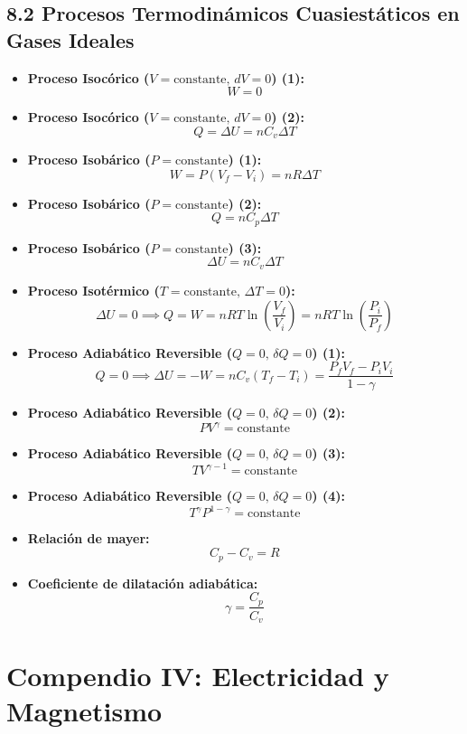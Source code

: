 \documentclass[11pt,a4paper]{article}
\begin{document}
\subsection*{8.2 Procesos Termodinámicos Cuasiestáticos en Gases Ideales}

\begin{itemize}
  \item \textbf{Proceso Isocórico ($V = \text{constante}, \, dV = 0$) (1):}
  \[
    W = 0
  \]
  \item \textbf{Proceso Isocórico ($V = \text{constante}, \, dV = 0$) (2):}
  \[
    Q = \Delta U = n C_v \Delta T
  \]
  \item \textbf{Proceso Isobárico ($P = \text{constante}$) (1):}
  \[
    W = P(V_f - V_i) = n R \Delta T
  \]
  \item \textbf{Proceso Isobárico ($P = \text{constante}$) (2):}
  \[
    Q = n C_p \Delta T
  \]
  \item \textbf{Proceso Isobárico ($P = \text{constante}$) (3):}
  \[
    \Delta U = n C_v \Delta T
  \]
  \item \textbf{Proceso Isotérmico ($T = \text{constante}, \, \Delta T = 0$):}
  \[
    \Delta U = 0 \implies Q = W = n R T \ln\left(\frac{V_f}{V_i}\right) = n R T \ln\left(\frac{P_i}{P_f}\right)
  \]
  \item \textbf{Proceso Adiabático Reversible ($Q = 0, \, \delta Q = 0$) (1):}
  \[
    Q = 0 \implies \Delta U = -W = n C_v (T_f - T_i) = \frac{P_f V_f - P_i V_i}{1 - \gamma}
  \]
  \item \textbf{Proceso Adiabático Reversible ($Q = 0, \, \delta Q = 0$) (2):}
  \[
    P V^\gamma = \text{constante}
  \]
  \item \textbf{Proceso Adiabático Reversible ($Q = 0, \, \delta Q = 0$) (3):}
  \[
    T V^{\gamma - 1} = \text{constante}
  \]
  \item \textbf{Proceso Adiabático Reversible ($Q = 0, \, \delta Q = 0$) (4):}
  \[
    T^\gamma P^{1 - \gamma} = \text{constante}
  \]
  \item \textbf{Relación de mayer:}
  \[
    C_p - C_v = R
  \]
  \item \textbf{Coeficiente de dilatación adiabática:}
  \[
    \gamma = \frac{C_p}{C_v}
  \]
\end{itemize}

\section*{Compendio IV: Electricidad y Magnetismo}
\end{document}
